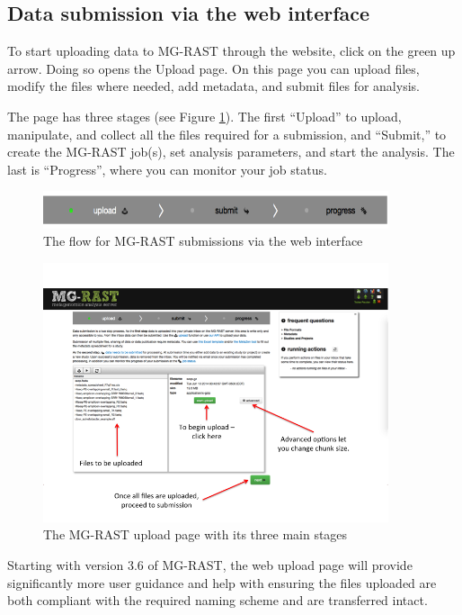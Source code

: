 \documentclass[12pt,fullpage]{report}
\begin{document}
\subsection*{Data submission via the web interface}

To start uploading data to MG-RAST through the website, click on the green up arrow. Doing so opens the Upload page. On this page you can upload files, modify the files where needed, add metadata, and submit files for analysis.

The page has three stages (see Figure \ref{fig:submission_stages}). The first “Upload” to upload, manipulate, and collect all the files required for a submission, and “Submit,” to create the MG-RAST job(s), set analysis parameters, and start the analysis. The last is “Progress”, where you can monitor your job status.
\begin{figure}
\begin{center}
\includegraphics[width=4in]{Images/submission_stages.png}
\end{center}
\label{fig:submission_stages}
\caption{The flow for MG-RAST submissions via the web interface}
\end{figure}

\begin{figure}
\begin{center}
\includegraphics[width=4in]{Images/upload_button.png}
\end{center}
\label{fig:upload_button}
\caption{The MG-RAST upload page with its three main stages}
\end{figure}

Starting with version 3.6 of MG-RAST, the web upload page will provide significantly more user guidance and help with ensuring the files uploaded are both compliant with the required naming scheme and are transferred intact.
\end{document}
